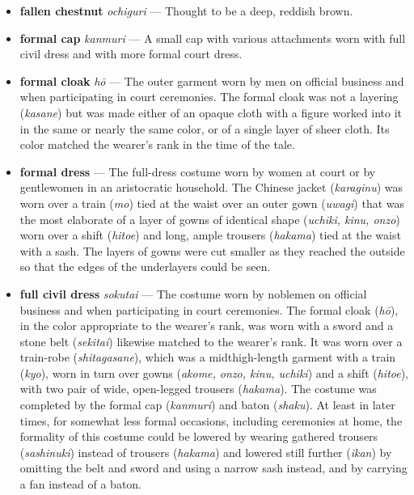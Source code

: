 \documentclass{article}
\begin{document}
\begin{multicols*}{2}
\begin{itemize}[
			label=,
			leftmargin=0em,
			rightmargin=-1.5em,
			itemindent=-2em,
			nosep,
		]
		\item \textbf{fallen chestnut} \textit{ochiguri} --- Thought to be a deep, reddish brown.

		\item \textbf{formal cap} \textit{kanmuri} --- A small cap with various attachments worn with full civil dress and with more formal court dress.

		\item \textbf{formal cloak} \textit{hō} --- The outer garment worn by men on official business and when participating in court ceremonies. The formal cloak was not a layering (\textit{kasane}) but was made either of an opaque cloth with a figure worked into it in the same or nearly the same color, or of a single layer of sheer cloth. Its color matched the wearer's rank in the time of the tale.

		\item \textbf{formal dress} --- The full-dress costume worn by women at court or by gentlewomen in an aristocratic household. The Chinese jacket (\textit{karaginu}) was worn over a train (\textit{mo}) tied at the waist over an outer gown (\textit{uwagi}) that was the most elaborate of a layer of gowns of identical shape (\textit{uchiki, kinu, onzo}) worn over a shift (\textit{hitoe}) and long, ample trousers (\textit{hakama}) tied at the waist with a sash. The layers of gowns were cut smaller as they reached the outside so that the edges of the underlayers could be seen.

		\item \textbf{full civil dress} \textit{sokutai} --- The costume worn by noblemen on official business and when participating in court ceremonies. The formal cloak (\textit{hō}), in the color appropriate to the wearer's rank, was worn with a sword and a stone belt (\textit{sekitai}) likewise matched to the wearer's rank. It was worn over a train-robe (\textit{shitagasane}), which was a midthigh-length garment with a train (\textit{kyo}), worn in turn over gowns (\textit{akome, onzo, kinu, uchiki}) and a shift (\textit{hitoe}), with two pair of wide, open-legged trousers (\textit{hakama}). The costume was completed by the formal cap (\textit{kanmuri}) and baton (\textit{shaku}). At least in later times, for somewhat less formal occasions, including ceremonies at home, the formality of this costume could be lowered by wearing gathered trousers (\textit{sashinuki}) instead of trousers (\textit{hakama}) and lowered still further (\textit{ikan}) by omitting the belt and sword and using a narrow sash instead, and by carrying a fan instead of a baton.


\end{itemize}
\end{multicols*}
\end{document}
